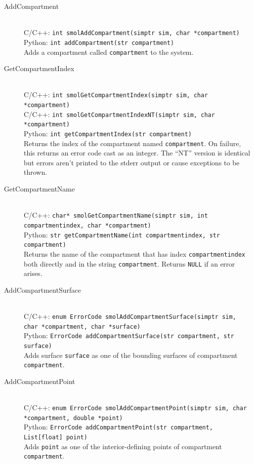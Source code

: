 \documentclass {scrbook}
\newcommand {\ttt} {\texttt}
\begin{document}
\begin{description}

\item[AddCompartment]
\hfill \\
C/C++: \ttt{int smolAddCompartment(simptr sim, char *compartment)}\\
Python: \ttt{int addCompartment(str compartment)}\\
Adds a compartment called \ttt{compartment} to the system.

\item[GetCompartmentIndex]
\hfill \\
C/C++: \ttt{int smolGetCompartmentIndex(simptr sim, char *compartment)}\\
C/C++: \ttt{int smolGetCompartmentIndexNT(simptr sim, char *compartment)}\\
Python: \ttt{int getCompartmentIndex(str compartment)}\\
Returns the index of the compartment named \ttt{compartment}. On failure, this returns an error code cast as an integer. The ``NT'' version is identical but errors aren't printed to the stderr output or cause exceptions to be thrown.

\item[GetCompartmentName]
\hfill \\
C/C++: \ttt{char* smolGetCompartmentName(simptr sim, int compartmentindex, char *compartment)}\\
Python: \ttt{str getCompartmentName(int compartmentindex, str compartment)}\\
Returns the name of the compartment that has index \ttt{compartmentindex} both directly and in the string \ttt{compartment}. Returns \ttt{NULL} if an error arises.

\item[AddCompartmentSurface]
\hfill \\
C/C++: \ttt{enum ErrorCode smolAddCompartmentSurface(simptr sim, char *compartment, char *surface)}\\
Python: \ttt{ErrorCode addCompartmentSurface(str compartment, str surface)}\\
Adds surface \ttt{surface} as one of the bounding surfaces of compartment \ttt{compartment}.

\item[AddCompartmentPoint]
\hfill \\
C/C++: \ttt{enum ErrorCode smolAddCompartmentPoint(simptr sim, char *compartment, double *point)}\\
Python: \ttt{ErrorCode addCompartmentPoint(str compartment, List[float] point)}\\
Adds \ttt{point} as one of the interior-defining points of compartment \ttt{compartment}.


\end{description}
\end{document}

